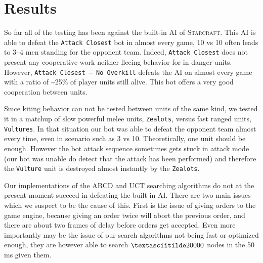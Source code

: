 \section{Results}




So far all of the testing has been against the built-in AI of \textsc{Starcraft}.
This AI is able to defeat the \texttt{Attack Closest} bot in almost every game, 10 vs 10 often leads to 3--4 men standing for the opponent team.
Indeed, \texttt{Attack Closest} does not present any cooperative work neither fleeing behavior for in danger units. However, \texttt{Attack Closest -- No Overkill} defeats the AI on almost every game with a ratio of \textasciitilde25\% of player units still alive. This bot offers a very good cooperation between units.

Since kiting behavior can not be tested between units of the same kind, we tested it in a matchup of slow powerful melee units, \texttt{Zealots}, versus fast ranged units, \texttt{Vultures}. 
In that situation our bot was able to defeat the opponent team almost every time, even in scenario such as 3 vs 10. 
Theoretically, one unit should be enough. However the bot attack sequence sometimes gets stuck in attack mode (our bot was unable do detect that the attack has been performed) and therefore the \texttt{Vulture} unit is destroyed almost instantly by the \texttt{Zealots}.

Our implementations of the ABCD and UCT searching algorithms do not at the present moment succeed in defeating the built-in AI.
There are two main issues which we suspect to be the cause of this.
First is the issue of giving orders to the game engine, because giving an order twice will abort the previous order, and there are about two frames of delay before orders get accepted.
Even more importantly may be the issue of our search algorithms not being fast or optimized enough, they are however able to search $\textasciitilde 20000$ nodes in the 50 ms given them.
